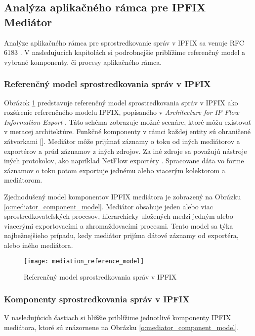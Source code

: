\subsection{Analýza aplikačného rámca pre IPFIX Mediátor} \label{sec:framework}

Analýze aplikačného rámca pre sprostredkovanie správ v IPFIX sa venuje RFC 6183 \citep{rfc6183}. 
V nasledujucich kapitolách si podrobnejšie priblížime referenčný model a vybrané komponenty, či procesy 
aplikačného rámca.

\subsubsection{Referenčný model sprostredkovania správ v IPFIX}


Obrázok \ref{o:mediation_reference_model} predstavuje referenčný model sprostredkovania správ v IPFIX 
ako rozšírenie referenčného modelu IPFIX, popísaného v \emph{Architecture for IP Flow Information Export} 
\citep{rfc5470}. Táto schéma zobrazuje možné scenáre, ktoré môžu existovať v meracej architektúre.
Funkčné komponenty v rámci každej entity sú ohraničené zátvorkami []. Mediátor môže prijímať 
záznamy o toku od iných mediátorov a exportérov a prúd záznamov z iných zdrojov.
Za iné zdroje sa považujú nástroje iných protokolov, ako napríklad NetFlow exportéry \citep{rfc3954}. 
Spracovane dáta vo forme záznamov o toku potom exportuje jednému alebo viacerým kolektorom a mediátorom.


Zjednodušený model komponentov IPFIX mediátora je zobrazený na Obrázku \ref{o:mediator_component_model}. 
Mediátor obsahuje jeden alebo viac sprostredkovateľských procesov, hierarchicky uložených 
medzi jedným alebo viacerými exportovacími a zhromažďovacími procesmi. Tento model sa týka 
najbežnejšieho prípadu, kedy mediátor prijíma dátové záznamy od exportéra, alebo iného mediátora.

\begin{figure}[ht!]
\centering
\texttt{[image: mediation\_reference\_model]}
\caption{Referenčný model sprostredkovania správ v IPFIX}\label{o:mediation_reference_model}
\end{figure}



\subsubsection{Komponenty sprostredkovania správ v IPFIX}

V nasledujúcich častiach si bližšie priblížime jednotlivé komponenty IPFIX mediátora, ktoré sú
znázornene na Obrázku \ref{o:mediator_component_model}.

